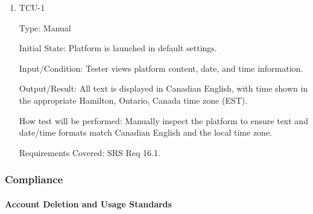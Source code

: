 \documentclass[12pt, titlepage]{article}
\begin{document}
\begin{enumerate}

    \item{TCU-1\\}

          Type: Manual

          Initial State: Platform is launched in default settings.

          Input/Condition: Tester views platform content, date, and time information.

          Output/Result: All text is displayed in Canadian English, with time shown in the appropriate Hamilton, Ontario, Canada time zone (EST).

          How test will be performed: Manually inspect the platform to ensure text and date/time formats match Canadian English and the local time zone.

          Requirements Covered: SRS Req 16.1.

\end{enumerate}

\subsubsection{Compliance}

\paragraph{Account Deletion and Usage Standards}
\end{document}
